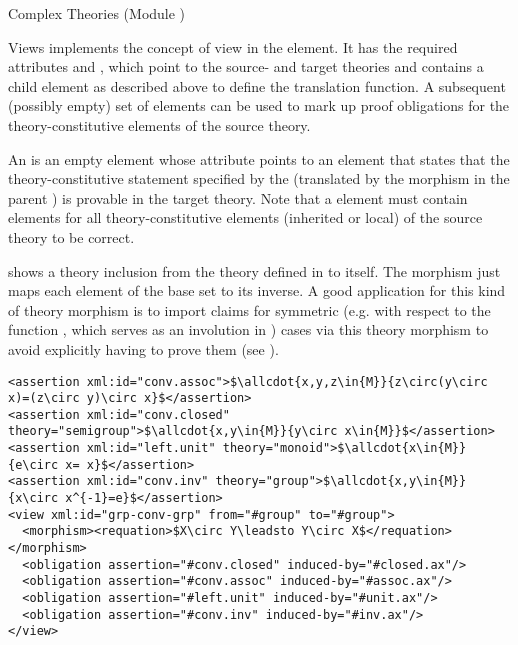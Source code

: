 \begin{tchapter}[id=complex-theories,short=Complex Theories]{Complex Theories (Module
    )}
\begin{tsection}[id=views]{Views}
  \omdoc implements the concept of view in the  
  element. It has the required attributes  and ,
  which point to the source- and target theories and contains a  child
  element as described above to define the translation function. A subsequent (possibly
  empty) set of  elements can be used to mark up proof obligations for
  the theory-constitutive elements of the source theory.

  An  is an empty element whose 
  attribute points to an  element that states that the
  theory-constitutive statement specified by the 
  (translated by the morphism in the parent ) is provable in the target
  theory. Note that a  element must contain 
  elements for all theory-constitutive elements (inherited or local) of the source theory
  to be correct.

 shows a theory inclusion from the theory
 defined in  to itself. The morphism just
maps each element of the base set to its inverse. A good application for this kind
of theory morphism is to import claims for symmetric (e.g. with respect to the
function , which serves as an involution in )
cases via this theory morphism to avoid explicitly having to prove them (see
).

\begin{lstlisting}[label=lst:view,mathescape,
  caption={A Theory Inclusion for Groups},
  index={view,morphism,requation,assertion}]
<assertion xml:id="conv.assoc">$\allcdot{x,y,z\in{M}}{z\circ(y\circ x)=(z\circ y)\circ x}$</assertion>
<assertion xml:id="conv.closed" theory="semigroup">$\allcdot{x,y\in{M}}{y\circ x\in{M}}$</assertion>
<assertion xml:id="left.unit" theory="monoid">$\allcdot{x\in{M}}{e\circ x= x}$</assertion>
<assertion xml:id="conv.inv" theory="group">$\allcdot{x,y\in{M}}{x\circ x^{-1}=e}$</assertion>
<view xml:id="grp-conv-grp" from="#group" to="#group">
  <morphism><requation>$X\circ Y\leadsto Y\circ X$</requation></morphism>
  <obligation assertion="#conv.closed" induced-by="#closed.ax"/>
  <obligation assertion="#conv.assoc" induced-by="#assoc.ax"/>
  <obligation assertion="#left.unit" induced-by="#unit.ax"/>
  <obligation assertion="#conv.inv" induced-by="#inv.ax"/>
</view>  
\end{lstlisting}
\end{tsection}


\end{tchapter}
